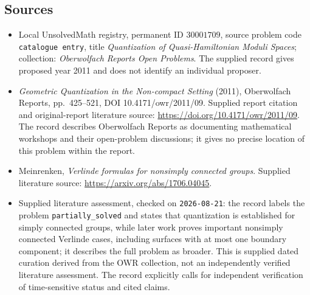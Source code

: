 \documentclass[11pt]{article}
\begin{document}
\subsection{Sources}
\begin{itemize}
\item Local UnsolvedMath registry, permanent ID \(30001709\), source problem code \texttt{catalogue entry}, title \emph{Quantization of Quasi-Hamiltonian Moduli Spaces}; collection: \emph{Oberwolfach Reports Open Problems}. The supplied record gives proposed year 2011 and does not identify an individual proposer.
\item \emph{Geometric Quantization in the Non-compact Setting} (2011), Oberwolfach Reports, pp.\ 425--521, DOI 10.4171/owr/2011/09. Supplied report citation and original-report literature source: \url{https://doi.org/10.4171/owr/2011/09}. The record describes Oberwolfach Reports as documenting mathematical workshops and their open-problem discussions; it gives no precise location of this problem within the report.
\item Meinrenken, \emph{Verlinde formulas for nonsimply connected groups}. Supplied literature source: \url{https://arxiv.org/abs/1706.04045}.
\item Supplied literature assessment, checked on \texttt{2026-08-21}: the record labels the problem \texttt{partially\_solved} and states that quantization is established for simply connected groups, while later work proves important nonsimply connected Verlinde cases, including surfaces with at most one boundary component; it describes the full problem as broader. This is supplied dated curation derived from the OWR collection, not an independently verified literature assessment. The record explicitly calls for independent verification of time-sensitive status and cited claims.
\end{itemize}
\end{document}
